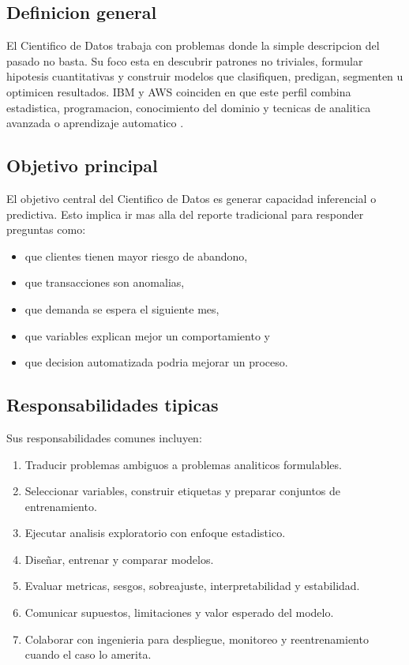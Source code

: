 \documentclass[12pt]{article}
\begin{document}
\subsection{Definicion general}
El Cientifico de Datos trabaja con problemas donde la simple descripcion del pasado no basta. Su foco esta en descubrir patrones no triviales, formular hipotesis cuantitativas y construir modelos que clasifiquen, predigan, segmenten u optimicen resultados. IBM y AWS coinciden en que este perfil combina estadistica, programacion, conocimiento del dominio y tecnicas de analitica avanzada o aprendizaje automatico \cite{ibm_data_science,aws_data_science}.

\subsection{Objetivo principal}
El objetivo central del Cientifico de Datos es generar capacidad inferencial o predictiva. Esto implica ir mas alla del reporte tradicional para responder preguntas como:
\begin{itemize}[leftmargin=*]
\item que clientes tienen mayor riesgo de abandono,
\item que transacciones son anomalias,
\item que demanda se espera el siguiente mes,
\item que variables explican mejor un comportamiento y
\item que decision automatizada podria mejorar un proceso.
\end{itemize}

\subsection{Responsabilidades tipicas}
Sus responsabilidades comunes incluyen:
\begin{enumerate}[label=\textbf{C\arabic*.}, leftmargin=*]
\item Traducir problemas ambiguos a problemas analiticos formulables.
\item Seleccionar variables, construir etiquetas y preparar conjuntos de entrenamiento.
\item Ejecutar analisis exploratorio con enfoque estadistico.
\item Diseñar, entrenar y comparar modelos.
\item Evaluar metricas, sesgos, sobreajuste, interpretabilidad y estabilidad.
\item Comunicar supuestos, limitaciones y valor esperado del modelo.
\item Colaborar con ingenieria para despliegue, monitoreo y reentrenamiento cuando el caso lo amerita.
\end{enumerate}
\end{document}
